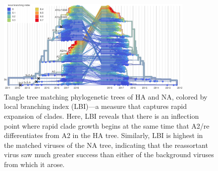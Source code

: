\documentclass[11pt,oneside,letterpaper]{article}
\begin{document}
\begin{figure}[b]
    \begin{center}
    \includegraphics[width=0.85\textwidth]{../manuscript/in-progress/texfiles/figures/ha_na_lbi_high_res.png}
    \end{center}
    \caption{Tangle tree matching phylogenetic trees of HA and NA, colored by local branching index (LBI)---a measure that captures rapid expansion of clades. Here, LBI reveals that there is an inflection point where rapid clade growth begins at the same time that A2/re differentiates from A2 in the HA tree. Similarly, LBI is highest in the matched viruses of the NA tree, indicating that the reassortant virus saw much greater success than either of the background viruses from which it arose.}
    \label{sup_fig:lbi}
\end{figure}
\end{document}
